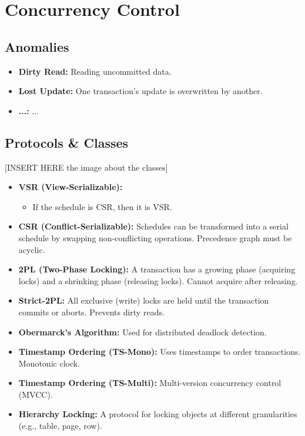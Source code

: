 
\section*{Concurrency Control}

\subsection*{Anomalies}
\begin{itemize}
    \item \textbf{Dirty Read:} Reading uncommitted data.
    \item \textbf{Lost Update:} One transaction's update is overwritten by another.
    \item \textbf{...:} ...
\end{itemize}

\subsection*{Protocols \& Classes}
[INSERT HERE the image about the classes]
\begin{itemize}
    \item \textbf{VSR (View-Serializable):}
    \begin{itemize}
        \item If the schedule is CSR, then it is VSR.
    \end{itemize}
    \item \textbf{CSR (Conflict-Serializable):} Schedules can be transformed into a serial schedule by swapping non-conflicting operations. Precedence graph must be acyclic.
    \item \textbf{2PL (Two-Phase Locking):} A transaction has a growing phase (acquiring locks) and a shrinking phase (releasing locks). Cannot acquire after releasing.
    \item \textbf{Strict-2PL:} All exclusive (write) locks are held until the transaction commits or aborts. Prevents dirty reads.
    \item \textbf{Obermarck's Algorithm:} Used for distributed deadlock detection.
    \item \textbf{Timestamp Ordering (TS-Mono):} Uses timestamps to order transactions. Monotonic clock.
    \item \textbf{Timestamp Ordering (TS-Multi):} Multi-version concurrency control (MVCC).
    \item \textbf{Hierarchy Locking:} A protocol for locking objects at different granularities (e.g., table, page, row).
\end{itemize}

